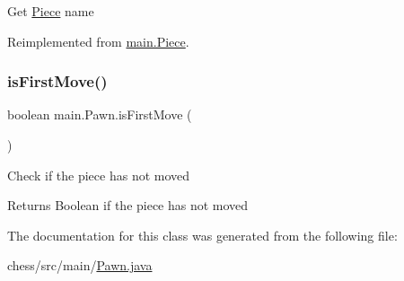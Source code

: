 Get \mbox{\hyperlink{classmain_1_1_piece}{Piece}} name 

Reimplemented from \mbox{\hyperlink{classmain_1_1_piece_a7bfe35e868d389f1e0bba2c5499fe6b0}{main.\+Piece}}.

\mbox{\label{classmain_1_1_pawn_ab9f754416283c01c007d60d03fce359a}} 
\subsubsection{\texorpdfstring{isFirstMove()}{isFirstMove()}}
{\footnotesize\ttfamily boolean main.\+Pawn.\+is\+First\+Move (\begin{DoxyParamCaption}{ }\end{DoxyParamCaption})\hspace{0.3cm}{\ttfamily [inline]}}

Check if the piece has not moved \begin{DoxyReturn}{Returns}
Boolean if the piece has not moved 
\end{DoxyReturn}


The documentation for this class was generated from the following file\+:\begin{DoxyCompactItemize}
\item 
chess/src/main/\mbox{\hyperlink{_pawn_8java}{Pawn.\+java}}\end{DoxyCompactItemize}
